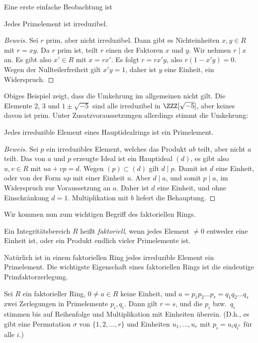 \documentclass[12pt,a4paper,twoside]{article}
\newcommand{\ei}[1]{\emph{#1}\index{#1}}
\begin{document}
Eine erste einfache Beobachtung ist
\begin{Lemma}
  Jedes Primelement ist irreduzibel.
\end{Lemma}
\begin{proof}[Beweis]
  Sei $r$ prim, aber nicht irreduzibel. Dann gibt es Nichteinheiten $x,y\in R$
  mit $r=xy$. Da $r$ prim ist, teilt $r$ einen der Faktoren $x$ und $y$. Wir
  nehmen $r\mid x$ an. Es gibt also $x'\in R$ mit $x=rx'$. Es folgt $r=rx'y$,
  also $r(1-x'y)=0$. Wegen der Nullteilerfreiheit gilt $x'y=1$, daher ist $y$
  eine Einheit, ein Widerspruch.
\end{proof}
  Obiges Beispiel zeigt, dass die Umkehrung im allgemeinen nicht gilt. Die
  Elemente $2$, $3$ und $1\pm\sqrt{-5}$ sind alle irreduzibel in
  $\ZZZ[\sqrt{-5}]$, aber keines davon ist prim. Unter Zusatzvoraussetzungen
  allerdings stimmt die Umkehrung:
\begin{Satz}
  Jedes irreduzible Element eines Hauptidealrings ist ein Primelement.
\end{Satz}
\begin{proof}[Beweis]
  Sei $p$ ein irreduzibles Element, welches das Produkt $ab$ teilt, aber nicht
  $a$ teilt. Das von $a$ und $p$ erzeugte Ideal ist ein Hauptideal $(d)$, es
  gibt also $u,v\in R$ mit $ua+vp=d$. Wegen $(p)\subset (d)$ gilt $d\mid
  p$. Damit ist $d$ eine Einheit, oder von der Form $up$ mit einer Einheit
  $u$. Aber $d\mid a$, und somit $p\mid a$, im Widerspruch zur Voraussetzung
  an $a$. Daher ist $d$ eine Einheit, und ohne Einschr\"ankung
  $d=1$. Multiplikation mit $b$ liefert die Behauptung.
\end{proof}  
Wir kommen nun zum wichtigen Begriff des faktoriellen Rings.
\begin{Definition}
  Ein Integrit\"atsbereich $R$ hei\ss t \ei{faktoriell}, wenn jedes Element
  $\ne0$ entweder eine Einheit ist, oder ein Produkt endlich vieler
  Primelemente ist.
\end{Definition}
Nat\"urlich ist in einem faktoriellen Ring jedes irreduzible Element ein
Primelement. Die wichtigste Eigenschaft eines faktoriellen Rings ist die
eindeutige Primfaktorzerlegung.
\begin{Satz}
  Sei $R$ ein faktorieller Ring, $0\ne a\in R$ keine Einheit, und
  $a=p_1p_2\dots p_r=q_1q_2\dots q_s$ zwei Zerlegungen in Primelemente $p_i,
  q_i$. Dann gilt $r=s$, und die $p_i$ bzw.\ $q_i$ stimmen bis auf Reihenfolge
  und Multiplikation mit Einheiten \"uberein. (D.h., es gibt eine Permutation
  $\sigma$ von $\{1,2,\dots,r\}$ und Einheiten $u_1,\dots,u_r$ mit
  $p_{i}=u_iq_{i^\sigma}$ f\"ur alle $i$.)
\end{Satz}
\end{document}
